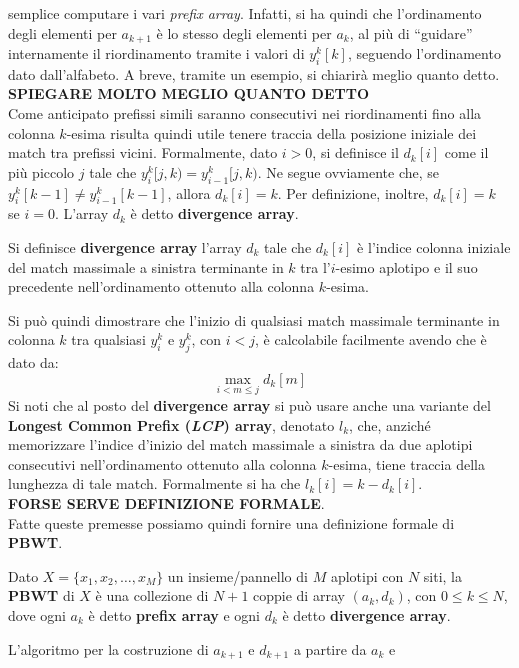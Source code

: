 semplice computare i vari \textit{prefix array}. Infatti, si ha
quindi che l'ordinamento degli elementi per $a_{k+1}$ è lo stesso degli elementi
per $a_k$, al più di ``guidare'' internamente il riordinamento tramite i valori
di $y_i^k[k]$, seguendo l'ordinamento dato dall'alfabeto. A breve, tramite un
esempio, si chiarirà meglio quanto detto.\\
\textbf{SPIEGARE MOLTO MEGLIO QUANTO DETTO}\\
Come anticipato prefissi simili saranno consecutivi nei riordinamenti fino alla
colonna $k$-esima risulta quindi utile tenere traccia della posizione iniziale
dei match tra prefissi vicini. Formalmente, dato $i>0$, si definisce il
$d_k[i]$ come il più piccolo $j$ tale che $y_i^k[j,k)=y_{i-1}^k[j,k)$. Ne segue
ovviamente che, se $y_i^k[k-1]\neq y_{i-1}^k[k-1]$, allora $d_k[i]=k$. Per
definizione, inoltre, $d_k[i]=k$ se $i=0$. L'array $d_k$ è detto
\textbf{divergence array}.
\begin{definizione}
  Si definisce \textbf{divergence array} l'array $d_k$ tale che $d_k[i]$ è
  l'indice colonna iniziale del match massimale a sinistra terminante in $k$ tra
  l'$i$-esimo aplotipo e il suo precedente nell'ordinamento ottenuto alla
  colonna $k$-esima.
\end{definizione}
Si può quindi dimostrare che l'inizio di qualsiasi match massimale terminante in
colonna $k$ tra qualsiasi $y_i^k$ e $y_j^k$, con $i<j$, è calcolabile facilmente
avendo che è dato da:
\[\max_{i<m\leq j}d_k[m]\]
Si noti che al posto del \textbf{divergence array} si può usare anche una
variante del \textbf{Longest Common Prefix (\textit{LCP}) array}, denotato
$l_k$, che, anziché 
memorizzare l'indice d'inizio del match massimale a sinistra da due aplotipi
consecutivi nell'ordinamento ottenuto alla colonna $k$-esima, tiene traccia
della lunghezza di tale match. Formalmente si ha che $l_k[i]=k-d_k[i]$. \\ 
\textbf{FORSE SERVE DEFINIZIONE FORMALE}.\\
Fatte queste premesse possiamo quindi fornire una definizione formale di
\textbf{PBWT}.
\begin{definizione}
  Dato $X=\{x_1,x_2,\ldots,x_M\}$ un insieme/pannello di $M$ aplotipi con $N$
  siti, la \textbf{PBWT} di $X$ è una collezione di $N+1$ coppie di array
  $(a_k,d_k)$, con $0\leq k\leq N$, dove ogni $a_k$ è detto \textbf{prefix
    array} e ogni $d_k$ è detto \textbf{divergence array}. 
\end{definizione}
L'algoritmo per la costruzione di $a_{k+1}$ e $d_{k+1}$ a partire da $a_k$ e
